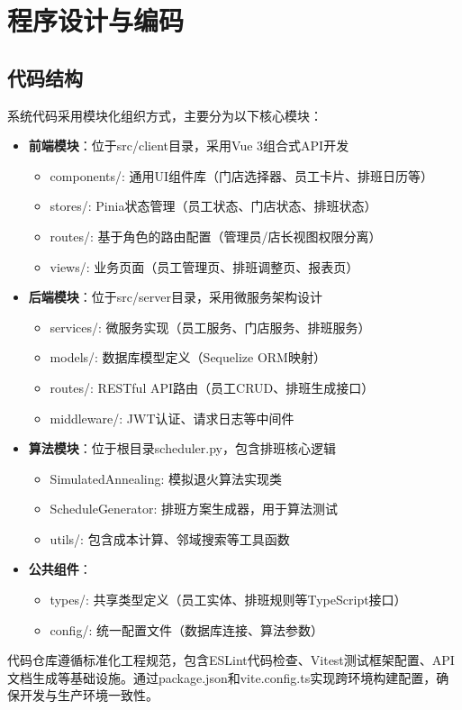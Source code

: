\documentclass{ctexart}
\begin{document}
\section{程序设计与编码}
\subsection{代码结构}
系统代码采用模块化组织方式，主要分为以下核心模块：
\begin{itemize}
    \item \textbf{前端模块}：位于src/client目录，采用Vue 3组合式API开发
    \begin{itemize}
        \item components/: 通用UI组件库（门店选择器、员工卡片、排班日历等）
        \item stores/: Pinia状态管理（员工状态、门店状态、排班状态）
        \item routes/: 基于角色的路由配置（管理员/店长视图权限分离）
        \item views/: 业务页面（员工管理页、排班调整页、报表页）
    \end{itemize}

    \item \textbf{后端模块}：位于src/server目录，采用微服务架构设计
    \begin{itemize}
        \item services/: 微服务实现（员工服务、门店服务、排班服务）
        \item models/: 数据库模型定义（Sequelize ORM映射）
        \item routes/: RESTful API路由（员工CRUD、排班生成接口）
        \item middleware/: JWT认证、请求日志等中间件
    \end{itemize}

    \item \textbf{算法模块}：位于根目录scheduler.py，包含排班核心逻辑
    \begin{itemize}
        \item SimulatedAnnealing: 模拟退火算法实现类
        \item ScheduleGenerator: 排班方案生成器，用于算法测试
        \item utils/: 包含成本计算、邻域搜索等工具函数
    \end{itemize}

    \item \textbf{公共组件}：
    \begin{itemize}
        \item types/: 共享类型定义（员工实体、排班规则等TypeScript接口）
        \item config/: 统一配置文件（数据库连接、算法参数）
    \end{itemize}
\end{itemize}
代码仓库遵循标准化工程规范，包含ESLint代码检查、Vitest测试框架配置、API文档生成等基础设施。通过package.json和vite.config.ts实现跨环境构建配置，确保开发与生产环境一致性。
\end{document}
